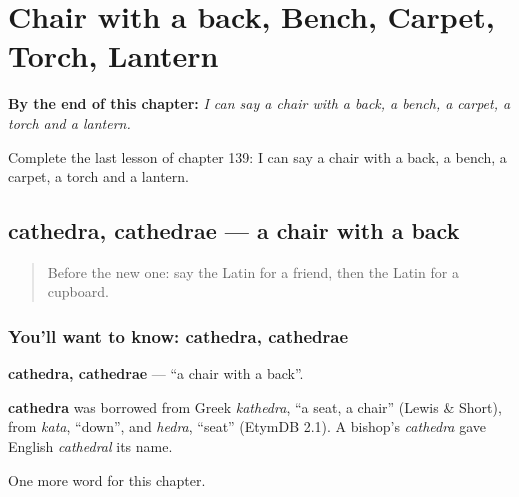 
\chapter{Chair with a back, Bench, Carpet, Torch, Lantern}
\label{ch:la-chair-with-a-back-bench-carpet-torch-lantern}

\begin{chapteropening}
\textbf{By the end of this chapter:} \emph{I can say a chair with a back, a bench, a carpet, a torch and a lantern.}

Complete the last lesson of chapter 139: I can say a chair with a back, a bench, a carpet, a torch and a lantern.
\end{chapteropening}

\section[cathedra, cathedrae]{cathedra, cathedrae — a chair with a back}

\label{lesson:LA-C139-cathedra}



\begin{quote}
Before the new one: say the Latin for a friend, then the Latin for a cupboard.
\end{quote}

\subsection*{You'll want to know: cathedra, cathedrae}
\textbf{cathedra, cathedrae} — \textquotedblleft{}a chair with a back\textquotedblright{}.

\begin{cousinweb}
\textbf{cathedra} was borrowed from Greek \emph{kathedra}, \textquotedblleft{}a seat, a chair\textquotedblright{} (Lewis \& Short), from \emph{kata}, \textquotedblleft{}down\textquotedblright{}, and \emph{hedra}, \textquotedblleft{}seat\textquotedblright{} (EtymDB 2.1). A bishop's \emph{cathedra} gave English \emph{cathedral} its name.
\end{cousinweb}

\begin{grammarlens}[title={What you've built}]
One more word for this chapter.
\end{grammarlens}

